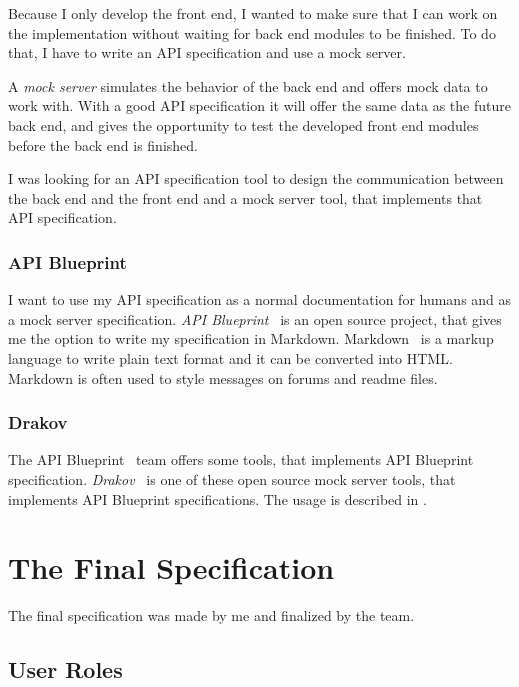 Because I only develop the front end, I wanted to make sure that I can work on the implementation without waiting for back end modules to be finished. To do that, I have to write an API specification and use a mock server. 

A \emph{mock server} simulates the behavior of the back end and offers mock data to work with. With a good API specification it will offer the same data as the future back end, and gives the opportunity to test the developed front end modules before the back end is finished.

I was looking for an API specification tool to design the communication between the back end and the front end and a mock server tool, that implements that API specification.

\subsubsection{API Blueprint}
\label{api-blueprint}

I want to use my API specification as a normal documentation for humans and as a mock server specification. \emph{API Blueprint}~\cite{api-blueprint} is an open source project, that gives me the option to write my specification in Markdown. Markdown~\cite{markdown} is a markup language to write plain text format and it can be converted into HTML. Markdown is often used to style messages on forums and readme files. 

\subsubsection{Drakov}


The API Blueprint~\cite{api-blueprint} team offers some tools, that implements API Blueprint specification. \emph{Drakov}~\cite{drakov} is one of these open source mock server tools, that implements API Blueprint specifications. The usage is described in .

\section{The Final Specification} \label{final-spec}
The final specification was made by me and finalized by the team.
\subsection{User Roles}

